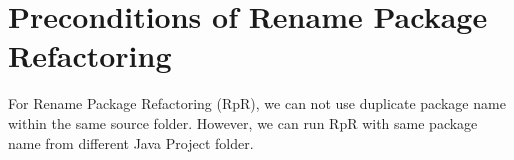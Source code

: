  \section{\textbf{Preconditions of Rename Package Refactoring}}

For Rename Package Refactoring (RpR), we can not use duplicate package name within the same source folder. However, we can run RpR with same package name from different Java Project folder.